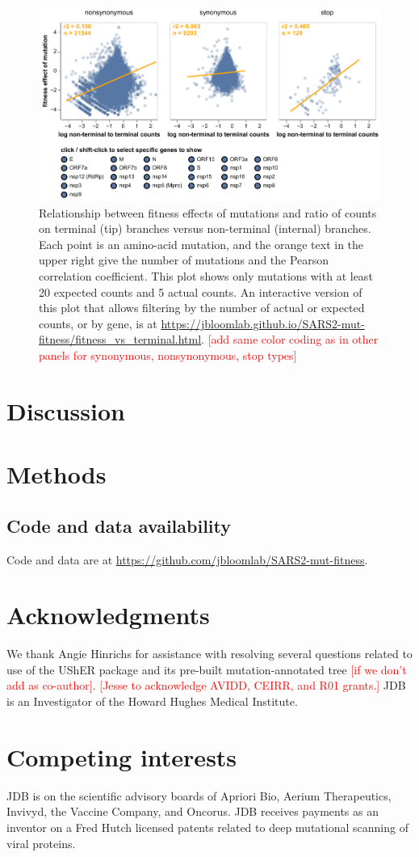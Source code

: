 \documentclass[9pt,twocolumn,twoside]{gsajnl_modified}
\newcommand\jdbcomment[1]{\textcolor{red}{[#1]}}
\begin{document}
\begin{figure}
\includegraphics[width=0.8\linewidth, trim={0 1.1in 0 0in}, clip=true]{figs/fitness_vs_terminal.pdf}
\caption{
Relationship between fitness effects of mutations and ratio of counts on terminal (tip) branches versus non-terminal (internal) branches.
Each point is an amino-acid mutation, and the orange text in the upper right give the number of mutations and the Pearson correlation coefficient.
This plot shows only mutations with at least 20 expected counts and 5 actual counts.
An interactive version of this plot that allows filtering by the number of actual or expected counts, or by gene, is at \url{https://jbloomlab.github.io/SARS2-mut-fitness/fitness_vs_terminal.html}.
\jdbcomment{add same color coding as in other panels for synonymous, nonsynonymous, stop types}
\label{fig:terminal}
}
\end{figure}

\section{Discussion}


{\small

\section{Methods}
\subsection{Code and data availability}
Code and data are at \url{https://github.com/jbloomlab/SARS2-mut-fitness}.

\section{Acknowledgments}
We thank Angie Hinrichs for assistance with resolving several questions related to use of the UShER package and its pre-built mutation-annotated tree \jdbcomment{if we don't add as co-author}.
\jdbcomment{Jesse to acknowledge AVIDD, CEIRR, and R01 grants.}
JDB is an Investigator of the Howard Hughes Medical Institute.

\section{Competing interests}
JDB is on the scientific advisory boards of Apriori Bio, Aerium Therapeutics, Invivyd, the Vaccine Company, and Oncorus.
JDB receives payments as an inventor on a Fred Hutch licensed patents related to deep mutational scanning of viral proteins.


}
\end{document}
